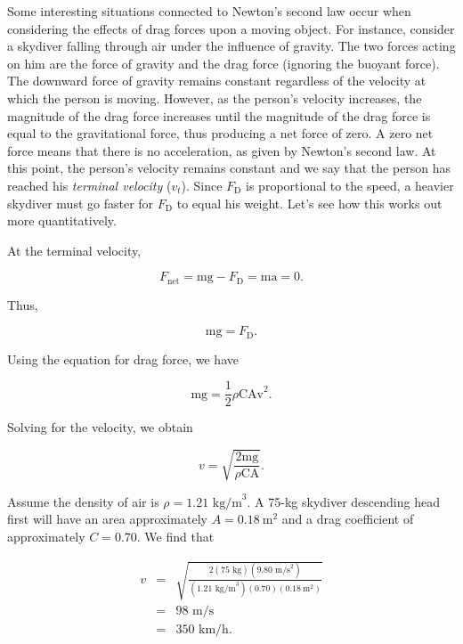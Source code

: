 \documentclass[
]{book}
\begin{document}
Some interesting situations connected to Newton's second law occur when
considering the effects of drag forces upon a moving object. For
instance, consider a skydiver falling through air under the influence of
gravity. The two forces acting on him are the force of gravity and the
drag force (ignoring the buoyant force). The downward force of gravity
remains constant regardless of the velocity at which the person is
moving. However, as the person's velocity increases, the magnitude of
the drag force increases until the magnitude of the drag force is equal
to the gravitational force, thus producing a net force of zero. A zero
net force means that there is no acceleration, as given by Newton's
second law. At this point, the person's velocity remains constant and
we say that the person has reached his \emph{terminal velocity} (\(v_{t}{}\)).
Since \(F_{\text{D}}{}\) is proportional to the speed, a heavier skydiver
must go faster for \(F_{\text{D}}{}\) to equal his weight. Let's see how
this works out more quantitatively.

At the terminal velocity,

\leavevmode\hypertarget{eip-303}{}%
\[{{{{F_{\text{net}} = {\text{mg} - F_{\text{D}}}} = \text{ma}} = 0}\text{.}}{}\]

Thus,

\leavevmode\hypertarget{eip-38}{}%
\[{{\text{mg} = F_{\text{D}}}\text{.}}{}\]

Using the equation for drag force, we have

\leavevmode\hypertarget{eip-19}{}%
\[{{{\text{mg} = \frac{1}{2}}\rho\text{CAv}^{2}}.}{}\]

Solving for the velocity, we obtain

\leavevmode\hypertarget{eip-545}{}%
\[{{v = \sqrt{\frac{2\text{mg}}{\rho\text{CA}}}}.}{}\]

Assume the density of air is
\({{\rho = 1}\text{.}\text{21\ kg}\text{/m}^{3}}{}\). A 75-kg skydiver
descending head first will have an area approximately
\({{A = 0}\text{.}\text{18}\ \text{m}^{2}}{}\) and a drag coefficient of
approximately \({{C = 0}\text{.}\text{70}}{}\). We find that

\leavevmode\hypertarget{eip-981}{}%
\[\begin{array}{lll}
v & = & \sqrt{\frac{2(\text{75\ kg})(9\text{.80\ m}\text{/s}^{2})}{(1\text{.}\text{21\ kg}\text{/m}^{3})(0\text{.}\text{70})(\text{0.18}\ \text{m}^{2})}} \\
 & = & \text{98\ m/s} \\
 & = & {\text{350\ km/h}\text{.}} \\
\end{array}\]
\end{document}
